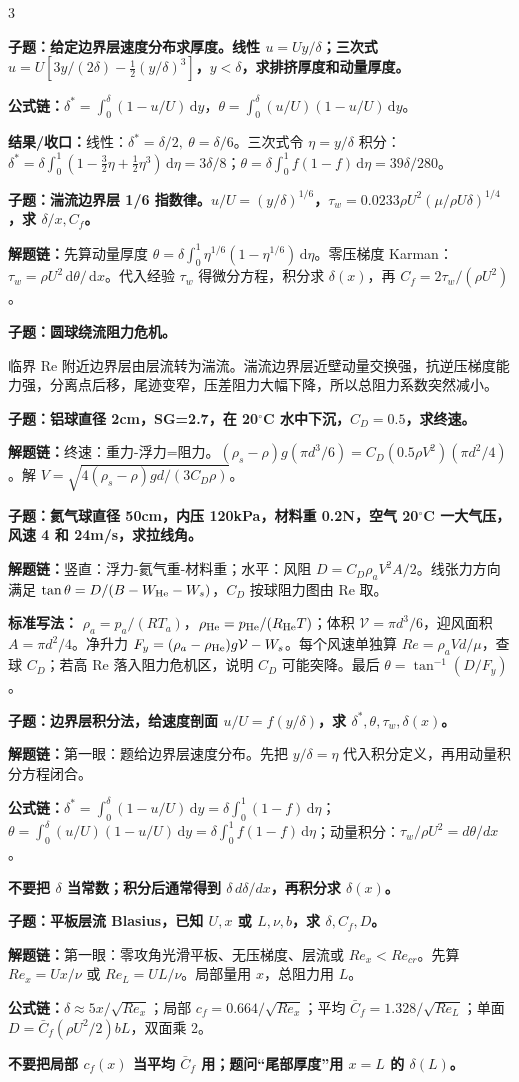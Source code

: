 \documentclass[a4paper]{article}
\newcommand{\qt}[1]{\vspace{0.10pt}\colorbox{Q}{\parbox{\dimexpr\linewidth-2\fboxsep}{\color{white}\bfseries #1}}\par}
\newcommand{\ans}[1]{\colorbox{G}{\parbox{\dimexpr\linewidth-2\fboxsep}{#1}}\par}
\newcommand{\warn}[1]{\colorbox{Y}{\parbox{\dimexpr\linewidth-2\fboxsep}{\color{E}\bfseries #1}}\par}
\newcommand{\chain}[1]{{\color{A}\bfseries 解题链：}#1\par}
\newcommand{\res}[1]{{\color{E}\bfseries 结果/收口：}#1\par}
\newcommand{\form}[1]{{\color{M}\bfseries 公式链：}#1\par}
\newcommand{\dd}{\,\mathrm d}
\begin{document}
\begin{multicols}{3}
\qt{子题：给定边界层速度分布求厚度。线性 $u=Uy/\delta$；三次式 $u=U[3y/(2\delta)-\frac12(y/\delta)^3]$，$y<\delta$，求排挤厚度和动量厚度。}
\form{$\delta^*=\int_0^\delta(1-u/U)\dd y$，$\theta=\int_0^\delta(u/U)(1-u/U)\dd y$。}
\res{线性：$\delta^*=\delta/2,\ \theta=\delta/6$。三次式令 $\eta=y/\delta$ 积分：$\delta^*=\delta\int_0^1(1-\frac32\eta+\frac12\eta^3)\dd\eta=3\delta/8$；$\theta=\delta\int_0^1 f(1-f)\dd\eta=39\delta/280$。}

\qt{子题：湍流边界层 1/6 指数律。$u/U=(y/\delta)^{1/6}$，$\tau_w=0.0233\rho U^2(\mu/\rho U\delta)^{1/4}$，求 $\delta/x,C_f$。}
\chain{先算动量厚度 $\theta=\delta\int_0^1\eta^{1/6}(1-\eta^{1/6})\dd\eta$。零压梯度 Karman：$\tau_w=\rho U^2\dd\theta/\dd x$。代入经验 $\tau_w$ 得微分方程，积分求 $\delta(x)$，再 $C_f=2\tau_w/(\rho U^2)$。}

\qt{子题：圆球绕流阻力危机。}
\ans{临界 Re 附近边界层由层流转为湍流。湍流边界层近壁动量交换强，抗逆压梯度能力强，分离点后移，尾迹变窄，压差阻力大幅下降，所以总阻力系数突然减小。}

\qt{子题：铝球直径 2cm，SG=2.7，在 20$^\circ$C 水中下沉，$C_D=0.5$，求终速。}
\chain{终速：重力-浮力=阻力。$(\rho_s-\rho)g(\pi d^3/6)=C_D(0.5\rho V^2)(\pi d^2/4)$。解 $V=\sqrt{4(\rho_s-\rho)gd/(3C_D\rho)}$。}

\qt{子题：氦气球直径 50cm，内压 120kPa，材料重 0.2N，空气 20$^\circ$C 一大气压，风速 4 和 24m/s，求拉线角。}
\chain{竖直：浮力-氦气重-材料重；水平：风阻 $D=C_D\rho_aV^2A/2$。线张力方向满足 $\tan\theta=D/(B-W_{\rm He}-W_s)$，$C_D$ 按球阻力图由 Re 取。}
\ans{\textbf{标准写法：} $\rho_a=p_a/(RT_a)$，$\rho_{\rm He}=p_{\rm He}/(R_{\rm He}T)$；体积 $\mathcal V=\pi d^3/6$，迎风面积 $A=\pi d^2/4$。净升力 $F_y=(\rho_a-\rho_{\rm He})g\mathcal V-W_s$。每个风速单独算 $Re=\rho_a Vd/\mu$，查球 $C_D$；若高 Re 落入阻力危机区，说明 $C_D$ 可能突降。最后 $\theta=\tan^{-1}(D/F_y)$。}

\qt{子题：边界层积分法，给速度剖面 $u/U=f(y/\delta)$，求 $\delta^*,\theta,\tau_w,\delta(x)$。}
\chain{第一眼：题给边界层速度分布。先把 $y/\delta=\eta$ 代入积分定义，再用动量积分方程闭合。}
\form{$\delta^*=\int_0^\delta(1-u/U)\dd y=\delta\int_0^1(1-f)\dd\eta$；$\theta=\int_0^\delta(u/U)(1-u/U)\dd y=\delta\int_0^1 f(1-f)\dd\eta$；动量积分：$\tau_w/\rho U^2=d\theta/dx$。}
\warn{不要把 $\delta$ 当常数；积分后通常得到 $\delta\,d\delta/dx$，再积分求 $\delta(x)$。}

\qt{子题：平板层流 Blasius，已知 $U,x$ 或 $L,\nu,b$，求 $\delta,C_f,D$。}
\chain{第一眼：零攻角光滑平板、无压梯度、层流或 $Re_x<Re_{cr}$。先算 $Re_x=Ux/\nu$ 或 $Re_L=UL/\nu$。局部量用 $x$，总阻力用 $L$。}
\form{$\delta\approx5x/\sqrt{Re_x}$；局部 $c_f=0.664/\sqrt{Re_x}$；平均 $\bar C_f=1.328/\sqrt{Re_L}$；单面 $D=\bar C_f(\rho U^2/2)bL$，双面乘 2。}
\warn{不要把局部 $c_f(x)$ 当平均 $\bar C_f$ 用；题问“尾部厚度”用 $x=L$ 的 $\delta(L)$。}


\end{multicols}
\end{document}
